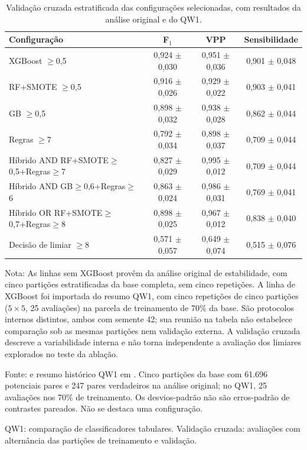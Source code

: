 \begin{table}[htbp]
\centering
\caption{Validação cruzada estratificada das configurações selecionadas, com resultados da análise original e do QW1.}
\label{tab:cv-5fold}
\small
\begin{tabular}{lccc}
\toprule
Configura\c{c}\~ao & F$_1$ & VPP & Sensibilidade \\
\midrule
XGBoost $\geq$0,5 & 0,924 $\pm$ 0,030 & 0,951 $\pm$ 0,036 & 0,901 $\pm$ 0,048 \\
RF+SMOTE $\geq$0,5 & 0,916 $\pm$ 0,026 & 0,929 $\pm$ 0,022 & 0,903 $\pm$ 0,041 \\
GB $\geq$0,5 & 0,898 $\pm$ 0,032 & 0,938 $\pm$ 0,028 & 0,862 $\pm$ 0,044 \\
Regras $\geq$7 & 0,792 $\pm$ 0,034 & 0,898 $\pm$ 0,037 & 0,709 $\pm$ 0,044 \\
Híbrido AND RF+SMOTE$\geq$0,5+Regras$\geq$7 & 0,827 $\pm$ 0,029 & 0,995 $\pm$ 0,012 & 0,709 $\pm$ 0,044 \\
Híbrido AND GB$\geq$0,6+Regras$\geq$6 & 0,863 $\pm$ 0,024 & 0,986 $\pm$ 0,031 & 0,769 $\pm$ 0,041 \\
Híbrido OR RF+SMOTE$\geq$0,7+Regras$\geq$8 & 0,898 $\pm$ 0,025 & 0,967 $\pm$ 0,012 & 0,838 $\pm$ 0,040 \\
Decisão de limiar $\geq$8 & 0,571 $\pm$ 0,057 & 0,649 $\pm$ 0,074 & 0,515 $\pm$ 0,076 \\
\bottomrule
\end{tabular}
\vspace{2pt}
\par\small Nota: As linhas sem XGBoost provêm da análise original de estabilidade, com cinco partições estratificadas da base completa, sem cinco repetições. A linha de XGBoost foi importada do resumo QW1, com cinco repetições de cinco partições ($5 \times 5$, 25 avaliações) na parcela de treinamento de 70\% da base. São protocolos internos distintos, ambos com semente 42; sua reunião na tabela não estabelece comparação sob as mesmas partições nem validação externa. A validação cruzada descreve a variabilidade interna e não torna independente a avaliação dos limiares explorados no teste da ablação.
\par\footnotesize Fonte:  e resumo histórico QW1 em . Cinco partições da base com 61.696 potenciais pares e 247 pares verdadeiros na análise original; no QW1, 25 avaliações nos 70\% de treinamento. Os desvios-padrão não são erros-padrão de contrastes pareados. Não se destaca uma configuração.
\par\footnotesize QW1: comparação de classificadores tabulares. Validação cruzada: avaliações com alternância das partições de treinamento e validação.
\end{table}
